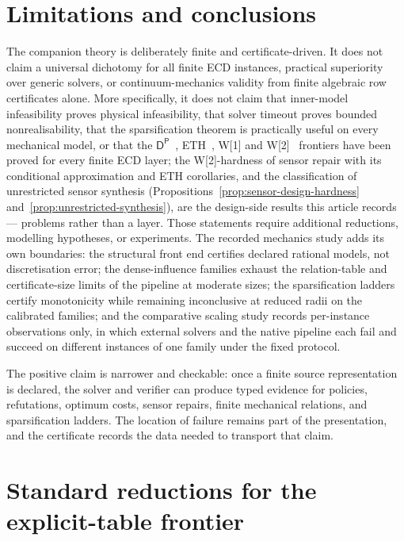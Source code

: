 \documentclass[11pt]{article}
\theoremstyle{plain}
\theoremstyle{definition}
\theoremstyle{remark}
\begin{document}
\section{Limitations and conclusions}
\label{sec:limitations}

The companion theory is deliberately finite and certificate-driven.  It does not
claim a universal dichotomy for all finite ECD instances, practical superiority
over generic solvers, or continuum-mechanics validity from finite algebraic row
certificates alone.  More specifically, it does not claim that inner-model
infeasibility proves physical infeasibility, that solver timeout proves bounded
nonrealisability, that the sparsification theorem is practically useful on every
mechanical model, or that the \(\mathsf
D^{\mathsf P}\)~\cite{papadimitriou94}, ETH~\cite{impagliazzo-paturi01},
W[1] and W[2]~\cite{downey-fellows99}
frontiers have been proved for every finite ECD layer; the W[2]-hardness of
sensor repair with its conditional approximation and ETH corollaries, and the
classification of unrestricted sensor synthesis
(Propositions~\ref{prop:sensor-design-hardness}
and~\ref{prop:unrestricted-synthesis}), are the design-side results this
article records --- problems rather than a layer.  Those statements require
additional reductions, modelling hypotheses, or experiments.  The recorded
mechanics study adds its own boundaries: the structural front end certifies
declared rational models, not discretisation error; the dense-influence families
exhaust the relation-table and certificate-size limits of the pipeline at
moderate sizes; the sparsification ladders certify monotonicity while remaining
inconclusive at reduced radii on the calibrated families; and the comparative
scaling study records per-instance observations only, in which external solvers
and the native pipeline each fail and succeed on different instances of one
family under the fixed protocol.

The positive claim is narrower and checkable: once a finite source
representation is declared, the solver and verifier can produce typed evidence
for policies, refutations, optimum costs, sensor repairs, finite mechanical
relations, and sparsification ladders.  The location of failure remains part of
the presentation, and the certificate records the data needed to transport that
claim.



\section{Standard reductions for the explicit-table frontier}
\label{app:reductions}
\end{document}
